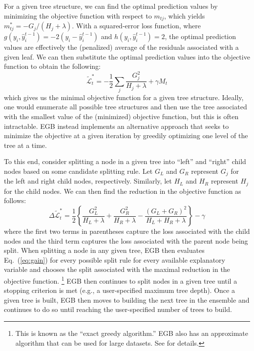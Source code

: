 \documentclass[english]{article}
\begin{document}
For a given tree structure, we can find the optimal prediction values by minimizing the objective function 
with respect to $m_{tj}$, which yields $m_{tj}^* = - G_j/(H_j + \lambda)$.
With a squared-error loss function, where $g(y_i, \hat{y}_i^{t-1}) = -2(y_i - \hat{y}_i^{t-1})$ and 
$h(y_i, \hat{y}_i^{t-1}) = 2$, the optimal prediction values are effectively the (penalized) average of the 
residuals associated with a given leaf.
We can then substitute the optimal prediction values into the objective function to obtain the following: 
\begin{equation}
\tilde{\mathcal{L}}_t^* = - \frac{1}{2}\sum_j \frac{G_j^2}{H_j + \lambda} + \gamma M_t
\end{equation}
which gives us the minimal objective function for a given tree structure.
Ideally, one would enumerate all possible tree structures and then use the tree associated with 
the smallest value of the (minimized) objective function, but this is often intractable.
EGB instead implements an alternative approach that seeks to minimize the objective at a given iteration 
by greedily optimizing one level of the tree at a time.

To this end, consider splitting a node in a given tree into ``left'' and ``right'' child nodes based on some
candidate splitting rule.
Let $G_L$ and $G_R$ represent $G_j$ for the left and right child nodes, respectively.
Similarly, let $H_L$ and $H_R$ represent $H_j$ for the child nodes.
We can then find the reduction in the objective function as follows:
\begin{equation}
\Delta \tilde{\mathcal{L}}_t^* = \frac{1}{2}\left\{\frac{G_L^2}{H_L + \lambda}  + \frac{G_R^2}{H_R + \lambda}
- \frac{(G_L + G_R)^2}{H_L + H_R + \lambda} \right\} - \gamma
\label{eq:gain}
\end{equation}
where the first two terms in parentheses capture the loss associated with the child nodes and the third
term captures the loss associated with the parent node being split.
When splitting a node in any given tree, EGB then evaluates Eq.\ (\ref{eq:gain}) for every possible split
rule for every available explanatory variable and chooses the split associated with the maximal reduction in 
the objective function.%
\footnote{This is known as the ``exact greedy algorithm.'' 
EGB also has an approximate algorithm that can be used for large datasets.
See \citet{chen2016xgboost} for details.}
EGB then continues to split nodes in a given tree until a stopping criterion is met (e.g., a user-specified
maximum tree depth).
Once a given tree is built, EGB then moves to building the next tree in the ensemble and continues to do
so until reaching the user-specified number of trees to build.
\end{document}
